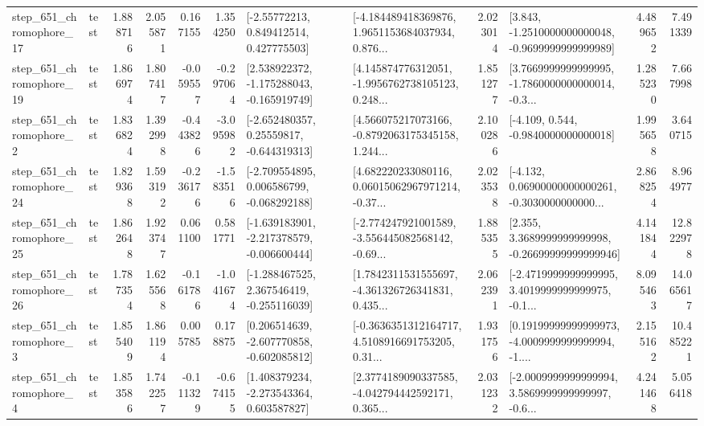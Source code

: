 \begin{tabular}{llrrrrllrlrr}
  step\_651\_chromophore\_17 &      test &      1.888716 &    2.055871 &      0.167155 &  1.354250 &     [-2.55772213, 0.849412514, 0.427775503] &  [-4.184489418369876, 1.9651153684037934, 0.876... &       2.023014 &  [3.843, -1.2510000000000048, -0.9699999999999989] &            4.489652 &          7.491339 \\
  step\_651\_chromophore\_19 &      test &      1.866974 &    1.807417 &     -0.059557 & -0.297064 &   [2.538922372, -1.175288043, -0.165919749] &  [4.145874776312051, -1.9956762738105123, 0.248... &       1.851277 &  [3.7669999999999995, -1.7860000000000014, -0.3... &            1.285230 &          7.667998 \\
   step\_651\_chromophore\_2 &      test &      1.836824 &    1.392998 &     -0.443826 & -3.095982 &    [-2.652480357, 0.25559817, -0.644319313] &  [4.566075217073166, -0.8792063175345158, 1.244... &       2.100286 &               [-4.109, 0.544, -0.9840000000000018] &            1.995658 &          3.640715 \\
  step\_651\_chromophore\_24 &      test &      1.829368 &    1.593192 &     -0.236176 & -1.583516 &   [-2.709554895, 0.006586799, -0.068292188] &  [4.682220233080116, 0.06015062967971214, -0.37... &       2.023538 &  [-4.132, 0.06900000000000261, -0.3030000000000... &            2.868254 &          8.964977 \\
  step\_651\_chromophore\_25 &      test &      1.862648 &    1.923747 &      0.061100 &  0.581771 &  [-1.639183901, -2.217378579, -0.006600444] &  [-2.774247921001589, -3.556445082568142, -0.69... &       1.885355 &  [2.355, 3.3689999999999998, -0.26699999999999946] &            4.141844 &         12.822978 \\
  step\_651\_chromophore\_26 &      test &      1.787354 &    1.625568 &     -0.161786 & -1.041674 &   [-1.288467525, 2.367546419, -0.255116039] &  [1.7842311531555697, -4.361326726341831, 0.435... &       2.062391 &  [-2.4719999999999995, 3.4019999999999975, -0.1... &            8.095463 &         14.065617 \\
   step\_651\_chromophore\_3 &      test &      1.855409 &    1.861194 &      0.005785 &  0.178875 &   [0.206514639, -2.607770858, -0.602085812] &  [-0.3636351312164717, 4.5108916691753205, 0.31... &       1.931756 &  [0.19199999999999973, -4.0009999999999994, -1.... &            2.155162 &         10.485221 \\
   step\_651\_chromophore\_4 &      test &      1.853586 &    1.742257 &     -0.111329 & -0.674155 &    [1.408379234, -2.273543364, 0.603587827] &  [2.3774189090337585, -4.042794442592171, 0.365... &       2.031232 &  [-2.0009999999999994, 3.5869999999999997, -0.6... &            4.241468 &          5.056418 \\

\end{tabular}
